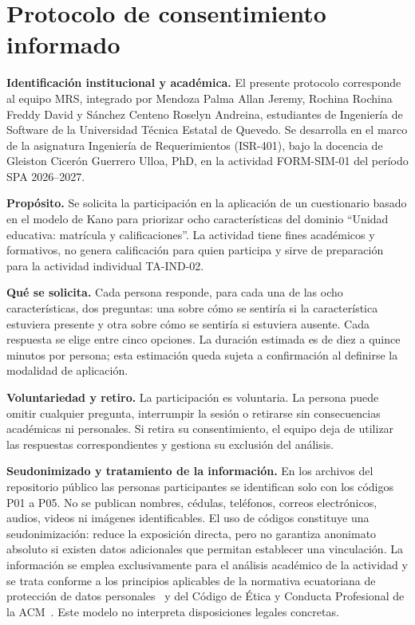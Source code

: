 \section{Protocolo de consentimiento informado}
\label{sec:consentimiento-kano}
\begingroup
\small
\setlength{\parskip}{3pt}

\noindent\textbf{Identificación institucional y académica.} El presente protocolo corresponde al equipo MRS, integrado por Mendoza Palma Allan Jeremy, Rochina Rochina Freddy David y Sánchez Centeno Roselyn Andreina, estudiantes de Ingeniería de Software de la Universidad Técnica Estatal de Quevedo. Se desarrolla en el marco de la asignatura Ingeniería de Requerimientos (ISR-401), bajo la docencia de Gleiston Cicerón Guerrero Ulloa, PhD, en la actividad FORM-SIM-01 del período SPA 2026--2027.

\noindent\textbf{Propósito.} Se solicita la participación en la aplicación de un cuestionario basado en el modelo de Kano para priorizar ocho características del dominio ``Unidad educativa: matrícula y calificaciones''. La actividad tiene fines académicos y formativos, no genera calificación para quien participa y sirve de preparación para la actividad individual TA-IND-02.

\noindent\textbf{Qué se solicita.} Cada persona responde, para cada una de las ocho características, dos preguntas: una sobre cómo se sentiría si la característica estuviera presente y otra sobre cómo se sentiría si estuviera ausente. Cada respuesta se elige entre cinco opciones. La duración estimada es de diez a quince minutos por persona; esta estimación queda sujeta a confirmación al definirse la modalidad de aplicación.

\noindent\textbf{Voluntariedad y retiro.} La participación es voluntaria. La persona puede omitir cualquier pregunta, interrumpir la sesión o retirarse sin consecuencias académicas ni personales. Si retira su consentimiento, el equipo deja de utilizar las respuestas correspondientes y gestiona su exclusión del análisis.

\noindent\textbf{Seudonimizado y tratamiento de la información.} En los archivos del repositorio público las personas participantes se identifican solo con los códigos P01 a P05. No se publican nombres, cédulas, teléfonos, correos electrónicos, audios, videos ni imágenes identificables. El uso de códigos constituye una seudonimización: reduce la exposición directa, pero no garantiza anonimato absoluto si existen datos adicionales que permitan establecer una vinculación. La información se emplea exclusivamente para el análisis académico de la actividad y se trata conforme a los principios aplicables de la normativa ecuatoriana de protección de datos personales~\cite{lopdp2021} y del Código de Ética y Conducta Profesional de la ACM~\cite{acm2018}. Este modelo no interpreta disposiciones legales concretas.

